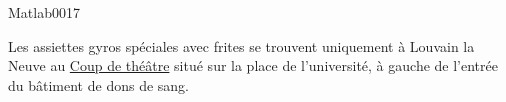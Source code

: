 \begin{corrige}{Matlab0017}



Les assiettes gyros spéciales avec frites se trouvent uniquement à Louvain la Neuve au \href{http://www.openstreetmap.org/?lat=50.669925&lon=4.615377&zoom=18&layers=B000FTFT}{Coup de théâtre} situé sur la place de l'université, à gauche de l'entrée du bâtiment de dons de sang. 

\end{corrige}
